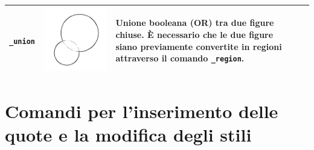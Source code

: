 \documentclass[..]{../IEEEphot}
\begin{document}
\begin{center}
\begin{longtable}{m{.2\linewidth}m{.2\linewidth}m{.25\linewidth}m{.25\linewidth}}
\texttt{\_union} & \includegraphics[width = 0.8\linewidth, keepaspectratio]{../images/jpg/_union.jpg} & Unione booleana (OR) tra due figure chiuse. È necessario che le due figure siano previamente convertite in regioni attraverso il comando \texttt{\_region}. & 
\\
\bottomrule
\end{longtable}
\end{center}

\clearpage

\section{Comandi per l'inserimento delle quote e la modifica degli stili}
\end{document}
